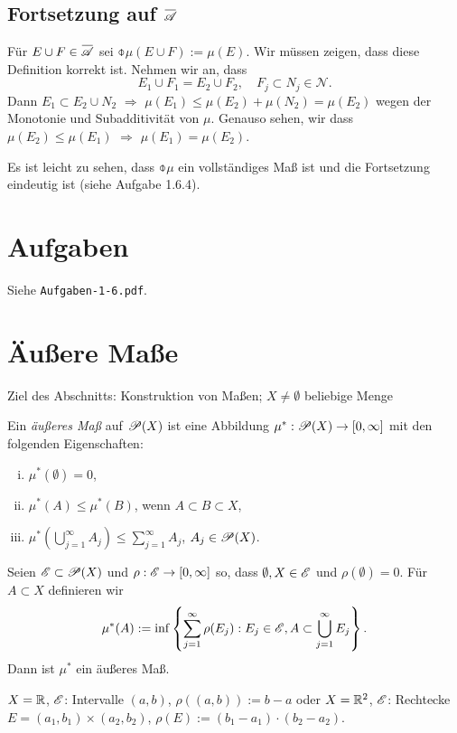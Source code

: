 \subsection*{Fortsetzung auf $\obar{\mA}$}
 Für $E \cup F \in \obar{\mA}$ sei $\obar{\mu}(E \cup F) := \mu(E)$. Wir müssen zeigen, dass diese Definition korrekt ist. Nehmen wir an, dass 
 \[ E_1 \cup F_1 = E_2 \cup F_2, \quad F_j \subset N_j \in \mathcal{N}. \]
 Dann $E_1 \subset E_2 \cup N_2$ $\Rightarrow$ $\mu(E_1) \le \mu(E_2) + \mu(N_2) = \mu(E_2)$ wegen der Monotonie und Subadditivität von $\mu$. Genauso sehen, wir dass $\mu(E_2) \le \mu(E_1)$ $\Rightarrow$ $\mu(E_1) = \mu(E_2)$.
 
 Es ist leicht zu sehen,  dass $\obar{\mu}$ ein vollständiges Maß ist und die Fortsetzung eindeutig ist (siehe Aufgabe 1.6.4).

\section{Aufgaben}
Siehe \verb+Aufgaben-1-6.pdf+.

\section{Äußere Maße}
Ziel des Abschnitts: Konstruktion von Maßen; $X \ne \emptyset$ beliebige Menge

\begin{defn}
 Ein \emph{äußeres Maß} auf $\mathscr{P}(X)$ ist eine Abbildung $\mu^* : \mathscr{P}(X) \to [0,\infty]$ mit den folgenden Eigenschaften:
 \begin{enumerate}[(i)]
  \item $\mu^*(\emptyset) = 0$,
  \item $\mu^*( A ) \le \mu^*(B)$, wenn $A \subset B \subset X$,
  \item $\mu^*( \bigcup_{j=1}^\infty A_j ) \le \sum_{j=1}^\infty A_j$, $A_j \in \mathscr{P}(X)$.
 \end{enumerate}
\end{defn}

\begin{lem}
 Seien $\mathscr{E} \subset \mathscr{P}(X)$ und $\rho: \mathscr{E} \to [0, \infty]$ so, dass $\emptyset, X \in \mathscr{E}$ und $\rho(\emptyset) = 0$. Für $A \subset X$ definieren wir
 \[ \mu^*(A) := \inf \left\{ \sum_{j=1}^\infty \rho(E_j) : E_j \in \mathscr{E}, A \subset \bigcup_{j=1}^\infty E_j \right\}. \]
 Dann ist $\mu^*$ ein äußeres Maß.
\end{lem}

\begin{exmp*}
 $X = \mathbb{R}$, $\mathscr{E}$: Intervalle $(a,b)$, $\rho((a,b)) := b-a$ oder $X = \mathbb{R}^2$, $\mathscr{E}$: Rechtecke $E = (a_1, b_1) \times (a_2, b_2)$, $\rho(E) := (b_1 - a_1) \cdot (b_2 - a_2)$.
\end{exmp*}

